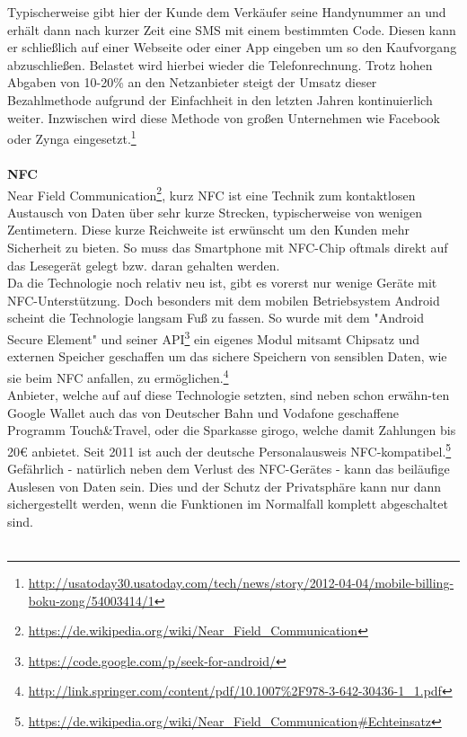 Typischerweise gibt hier der Kunde dem Verkäufer seine Handynummer an und erhält dann nach kurzer Zeit eine SMS mit einem bestimmten Code. Diesen kann er schließlich auf einer Webseite oder einer App eingeben um so den Kaufvorgang abzuschließen. Belastet wird hierbei wieder die Telefonrechnung.
Trotz hohen Abgaben von 10-20\% an den Netzanbieter steigt der Umsatz dieser Bezahlmethode aufgrund der Einfachheit in den letzten Jahren kontinuierlich weiter. Inzwischen wird diese Methode von großen Unternehmen wie Facebook oder Zynga eingesetzt.\footnote{\url{http://usatoday30.usatoday.com/tech/news/story/2012-04-04/mobile-billing-boku-zong/54003414/1}}\\
\\
\textbf{NFC}\\
Near Field Communication\footnote{\url{https://de.wikipedia.org/wiki/Near_Field_Communication}}, kurz NFC ist eine Technik zum kontaktlosen Austausch von Daten über sehr kurze Strecken, typischerweise von wenigen Zentimetern. Diese kurze Reichweite ist erwünscht um den Kunden mehr Sicherheit zu bieten. So muss das Smartphone mit NFC-Chip oftmals direkt auf das Lesegerät gelegt bzw. daran gehalten werden. \\
Da die Technologie noch relativ neu ist, gibt es vorerst nur wenige Geräte mit NFC-Unterstützung. Doch besonders mit dem mobilen Betriebsystem Android scheint die Technologie langsam Fuß zu fassen. So wurde mit dem "Android Secure Element" und seiner API\footnote{\url{https://code.google.com/p/seek-for-android/}} ein eigenes Modul mitsamt Chipsatz und externen Speicher geschaffen um das sichere Speichern von sensiblen Daten, wie sie beim NFC anfallen, zu ermöglichen.\footnote{\url{http://link.springer.com/content/pdf/10.1007\%2F978-3-642-30436-1_1.pdf}}\\
Anbieter, welche auf auf diese Technologie setzten, sind neben schon erwähn-ten Google Wallet auch das von Deutscher Bahn und Vodafone geschaffene Programm Touch\&Travel, oder die Sparkasse girogo, welche damit Zahlungen bis 20\euro{} anbietet.
Seit 2011 ist auch der deutsche Personalausweis NFC-kompatibel.\footnote{\url{https://de.wikipedia.org/wiki/Near_Field_Communication\#Echteinsatz}}\\
Gefährlich - natürlich neben dem Verlust des NFC-Gerätes - kann das beiläufige Auslesen von Daten sein. Dies und der Schutz der Privatsphäre kann nur dann sichergestellt werden, wenn die Funktionen im Normalfall komplett abgeschaltet sind.\\
\\
